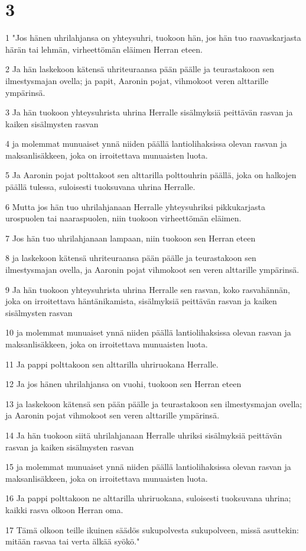 \chapter{3}

\par 1 "Jos hänen uhrilahjansa on yhteysuhri, tuokoon hän, jos hän tuo raavaskarjasta härän tai lehmän, virheettömän eläimen Herran eteen.
\par 2 Ja hän laskekoon kätensä uhriteuraansa pään päälle ja teurastakoon sen ilmestysmajan ovella; ja papit, Aaronin pojat, vihmokoot veren alttarille ympärinsä.
\par 3 Ja hän tuokoon yhteysuhrista uhrina Herralle sisälmyksiä peittävän rasvan ja kaiken sisälmysten rasvan
\par 4 ja molemmat munuaiset ynnä niiden päällä lantiolihaksissa olevan rasvan ja maksanlisäkkeen, joka on irroitettava munuaisten luota.
\par 5 Ja Aaronin pojat polttakoot sen alttarilla polttouhrin päällä, joka on halkojen päällä tulessa, suloisesti tuoksuvana uhrina Herralle.
\par 6 Mutta jos hän tuo uhrilahjanaan Herralle yhteysuhriksi pikkukarjasta urospuolen tai naaraspuolen, niin tuokoon virheettömän eläimen.
\par 7 Jos hän tuo uhrilahjanaan lampaan, niin tuokoon sen Herran eteen
\par 8 ja laskekoon kätensä uhriteuraansa pään päälle ja teurastakoon sen ilmestysmajan ovella, ja Aaronin pojat vihmokoot sen veren alttarille ympärinsä.
\par 9 Ja hän tuokoon yhteysuhrista uhrina Herralle sen rasvan, koko rasvahännän, joka on irroitettava häntänikamista, sisälmyksiä peittävän rasvan ja kaiken sisälmysten rasvan
\par 10 ja molemmat munuaiset ynnä niiden päällä lantiolihaksissa olevan rasvan ja maksanlisäkkeen, joka on irroitettava munuaisten luota.
\par 11 Ja pappi polttakoon sen alttarilla uhriruokana Herralle.
\par 12 Ja jos hänen uhrilahjansa on vuohi, tuokoon sen Herran eteen
\par 13 ja laskekoon kätensä sen pään päälle ja teurastakoon sen ilmestysmajan ovella; ja Aaronin pojat vihmokoot sen veren alttarille ympärinsä.
\par 14 Ja hän tuokoon siitä uhrilahjanaan Herralle uhriksi sisälmyksiä peittävän rasvan ja kaiken sisälmysten rasvan
\par 15 ja molemmat munuaiset ynnä niiden päällä lantiolihaksissa olevan rasvan ja maksanlisäkkeen, joka on irroitettava munuaisten luota.
\par 16 Ja pappi polttakoon ne alttarilla uhriruokana, suloisesti tuoksuvana uhrina; kaikki rasva olkoon Herran oma.
\par 17 Tämä olkoon teille ikuinen säädös sukupolvesta sukupolveen, missä asuttekin: mitään rasvaa tai verta älkää syökö."

